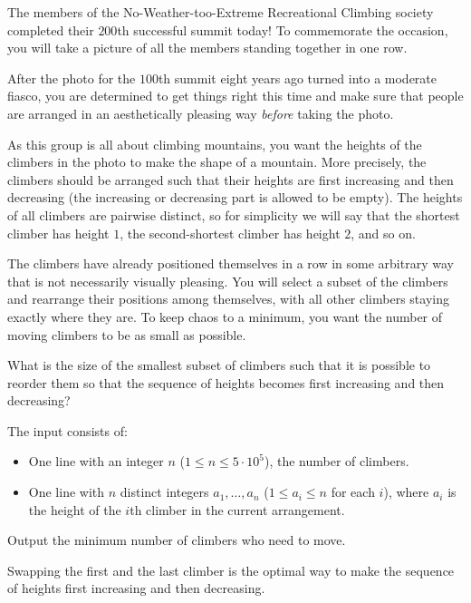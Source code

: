 

\newcommand{\maxn}{5 \cdot 10^5}

The members of the No-Weather-too-Extreme Recreational Climbing society
completed their $200$th successful summit today! To commemorate the occasion,
you will take a picture of all the members standing together in one row.

After the photo for the $100$th summit eight years ago turned into a moderate
fiasco, you are determined to get things right this time and make sure that
people are arranged in an aesthetically pleasing way \textit{before} taking the
photo.

As this group is all about climbing mountains, you want the heights of the
climbers in the photo to make the shape of a mountain. More
precisely, the climbers
should be arranged such that their heights are first increasing and then
decreasing (the increasing or decreasing part is allowed to be empty). The
heights of all climbers are pairwise distinct, so for simplicity we will say
that the shortest climber has height $1$, the second-shortest climber has
height $2$, and so on.

The climbers have already positioned themselves in a row in some arbitrary way
that is not necessarily visually pleasing. You will select a subset of the
climbers and rearrange their positions among themselves, with all other climbers
staying exactly where they are. To keep chaos to a minimum, you want the number
of moving climbers to be as small as possible.

What is the size of the smallest subset of climbers such that it is possible
to reorder them so that the sequence of heights becomes first increasing and then
decreasing?

\begin{Input}
    The input consists of:
    \begin{itemize}
        \item One line with an integer $n$ ($1\leq n\leq \maxn$), the number of
			climbers.
        \item One line with $n$ distinct integers $a_1, \ldots, a_n$ ($1 \leq a_i \leq n$ for each $i$), where $a_i$ is the height of the $i$th climber in the current arrangement.
    \end{itemize}
\end{Input}

\begin{Output}
    Output the minimum number of climbers who need to move.
\end{Output}

\nextsample

Swapping the first and the last climber is the optimal way
to make the sequence of heights first increasing and then decreasing.
